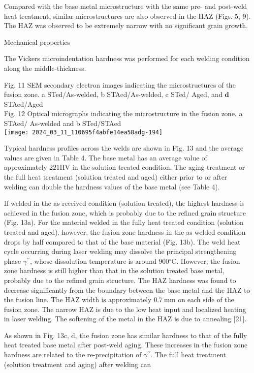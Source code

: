 \documentclass[10pt]{article}
\begin{document}
Compared with the base metal microstructure with the same pre- and post-weld heat treatment, similar microstructures are also observed in the HAZ (Figs. 5, 9). The HAZ was observed to be extremely narrow with no significant grain growth.

Mechanical properties

The Vickers microindentation hardness was performed for each welding condition along the middle-thickness.

Fig. 11 SEM secondary electron images indicating the microstructures of the fusion zone. a STed/As-welded, b STAed/As-welded, c STed/ Aged, and $\mathbf{d}$ STAed/Aged\\
Fig. 12 Optical micrographs indicating the microstructure in the fusion zone. a STAed/ As-welded and b STed/STAed\\
\texttt{[image: 2024\_03\_11\_110695f4abfe14ea58adg-194]}

Typical hardness profiles across the welds are shown in Fig. 13 and the average values are given in Table 4. The base metal has an average value of approximately $221 \mathrm{HV}$ in the solution treated condition. The aging treatment or the full heat treatment (solution treated and aged) either prior to or after welding can double the hardness values of the base metal (see Table 4).

If welded in the as-received condition (solution treated), the highest hardness is achieved in the fusion zone, which is probably due to the refined grain structure (Fig. 13a). For the material welded in the fully heat treated condition (solution treated and aged), however, the fusion zone hardness in the as-welded condition drops by half compared to that of the base material (Fig. 13b). The weld heat cycle occurring during laser welding may dissolve the principal strengthening phase $\gamma^{\prime \prime}$, whose dissolution temperature is around $900{ }^{\circ} \mathrm{C}$. However, the fusion zone hardness is still higher than that in the solution treated base metal, probably due to the refined grain structure. The HAZ hardness was found to decrease significantly from the boundary between the base metal and the HAZ to the fusion line. The HAZ width is approximately $0.7 \mathrm{~mm}$ on each side of the fusion zone. The narrow HAZ is due to the low heat input and localized heating in laser welding. The softening of the metal in the HAZ is due to annealing [21].

As shown in Fig. 13c, d, the fusion zone has similar hardness to that of the fully heat treated base metal after post-weld aging. These increases in the fusion zone hardness are related to the re-precipitation of $\gamma^{\prime \prime}$. The full heat treatment (solution treatment and aging) after welding can
\end{document}

